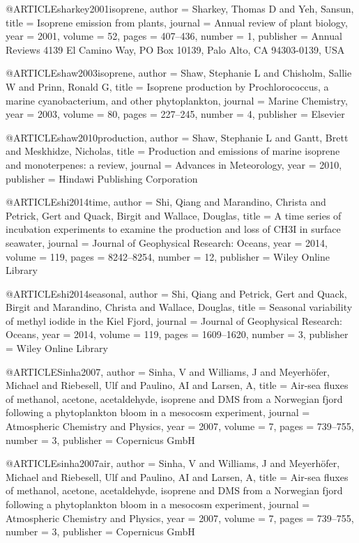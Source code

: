 @ARTICLE{sharkey2001isoprene,
  author = {Sharkey, Thomas D and Yeh, Sansun},
  title = {Isoprene emission from plants},
  journal = {Annual review of plant biology},
  year = {2001},
  volume = {52},
  pages = {407--436},
  number = {1},
  publisher = {Annual Reviews 4139 El Camino Way, PO Box 10139, Palo Alto, CA 94303-0139,
	USA}
}

@ARTICLE{shaw2003isoprene,
  author = {Shaw, Stephanie L and Chisholm, Sallie W and Prinn, Ronald G},
  title = {Isoprene production by Prochlorococcus, a marine cyanobacterium,
	and other phytoplankton},
  journal = {Marine Chemistry},
  year = {2003},
  volume = {80},
  pages = {227--245},
  number = {4},
  publisher = {Elsevier}
}

@ARTICLE{shaw2010production,
  author = {Shaw, Stephanie L and Gantt, Brett and Meskhidze, Nicholas},
  title = {Production and emissions of marine isoprene and monoterpenes: a review},
  journal = {Advances in Meteorology},
  year = {2010},
  publisher = {Hindawi Publishing Corporation}
}

@ARTICLE{shi2014time,
  author = {Shi, Qiang and Marandino, Christa and Petrick, Gert and Quack, Birgit
	and Wallace, Douglas},
  title = {A time series of incubation experiments to examine the production
	and loss of CH3I in surface seawater},
  journal = {Journal of Geophysical Research: Oceans},
  year = {2014},
  volume = {119},
  pages = {8242--8254},
  number = {12},
  publisher = {Wiley Online Library}
}

@ARTICLE{shi2014seasonal,
  author = {Shi, Qiang and Petrick, Gert and Quack, Birgit and Marandino, Christa
	and Wallace, Douglas},
  title = {Seasonal variability of methyl iodide in the Kiel Fjord},
  journal = {Journal of Geophysical Research: Oceans},
  year = {2014},
  volume = {119},
  pages = {1609--1620},
  number = {3},
  publisher = {Wiley Online Library}
}

@ARTICLE{Sinha2007,
  author = {Sinha, V and Williams, J and Meyerh{\"o}fer, Michael and Riebesell,
	Ulf and Paulino, AI and Larsen, A},
  title = {Air-sea fluxes of methanol, acetone, acetaldehyde, isoprene and DMS
	from a Norwegian fjord following a phytoplankton bloom in a mesocosm
	experiment},
  journal = {Atmospheric Chemistry and Physics},
  year = {2007},
  volume = {7},
  pages = {739--755},
  number = {3},
  publisher = {Copernicus GmbH}
}

@ARTICLE{sinha2007air,
  author = {Sinha, V and Williams, J and Meyerh{\"o}fer, Michael and Riebesell,
	Ulf and Paulino, AI and Larsen, A},
  title = {Air-sea fluxes of methanol, acetone, acetaldehyde, isoprene and DMS
	from a Norwegian fjord following a phytoplankton bloom in a mesocosm
	experiment},
  journal = {Atmospheric Chemistry and Physics},
  year = {2007},
  volume = {7},
  pages = {739--755},
  number = {3},
  publisher = {Copernicus GmbH}
}

